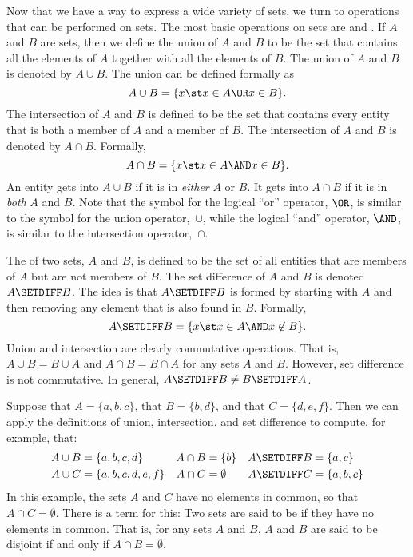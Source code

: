 \medbreak

Now that we have a way to express a wide variety of sets, we turn to operations that
can be performed on sets.  The most basic operations on sets are 
 and .  If $A$ and $B$ are sets, then we define
the union of $A$ and $B$ to be the set that contains all the elements of
$A$ together with all the elements of $B$.  The union of $A$ and $B$ is
denoted by $A\cup B$.  The union can be defined formally as
\[A\cup B = \{x\st x\in A \OR x\in B\}.\]
The intersection of $A$ and $B$ is defined to be the set that contains
every entity that is both a member of $A$ and a member of $B$. The intersection
of $A$ and $B$ is denoted by $A\cap B$.  Formally,
\[A\cap B = \{x\st x\in A \AND x\in B\}.\]
An entity gets into $A\cup B$ if it is in \emph{either} $A$ or $B$.
It gets into $A\cap B$ if it is in \emph{both} $A$ and $B$.  Note that
the symbol for the logical ``or'' operator, $\OR$, is similar to the
symbol for the union operator,~$\cup$, while the logical ``and'' operator,
$\AND$, is similar to the intersection operator,~$\cap$.

The  of two sets, $A$ and $B$, is defined to be
the set of all entities that are members of $A$ but are not members
of $B$.  The set difference of $A$ and $B$ is denoted $A\SETDIFF B$.
The idea is that $A\SETDIFF B$ is formed by starting with
$A$ and then removing any element that is also found in $B$.  Formally,
\[A\SETDIFF B = \{x\st x\in A \AND x\not\in B\}.\]
Union and intersection are clearly commutative operations.  That
is, $A\cup B=B\cup A$ and $A\cap B=B\cap A$ for any sets $A$ and $B$.
However, set difference is not commutative.  In general,
$A\SETDIFF B \not= B\SETDIFF A$.

Suppose that $A=\{a,b,c\}$, that $B=\{b,d\}$, and
that $C=\{d,e,f\}$.  Then we can apply the definitions of
union, intersection, and set difference to compute, for example,
that:
\begin{align*}
   A\cup B &= \{a,b,c,d\} &  A\cap B &= \{b\}   &  A\SETDIFF B &= \{a,c\}\\
   A\cup C &= \{a,b,c,d,e,f\}&A\cap C&= \emptyset & A\SETDIFF C &= \{a,b,c\}
\end{align*}
In this example, the sets $A$ and $C$ have no elements in common, so
that $A\cap C=\emptyset$.  There is a term for this:
Two sets are said to be  if they
have no elements in common.  That is, for any sets $A$ and $B$,
$A$ and $B$ are said to be disjoint if and only if $A\cap B=\emptyset$.


